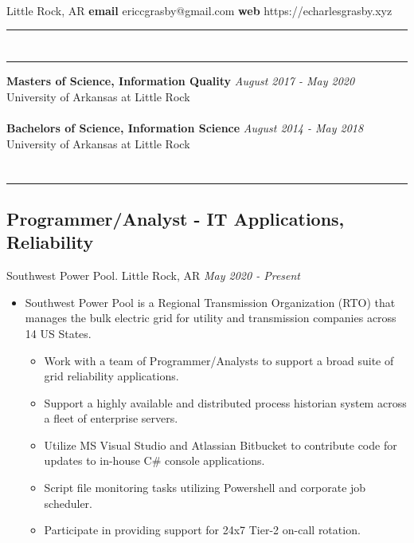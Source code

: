 \documentclass[11pt]{article}
\author{Eric Charles Grasby}
\newcommand{\ualr}{University of Arkansas at Little Rock}
\newcommand{\uppr}[3]{ \noindent\MakeUppercase{{\fontsize{#2}{#3} \selectfont {#1}}} }
\begin{document}
\begin{center}
\uppr{\textbf{Eric Charles Grasby}}{24}{28} \\
\vspace{20px}
Little Rock, AR \hfill \textbf{email} ericcgrasby@gmail.com \hfill \textbf{web} https://echarlesgrasby.xyz
\noindent \rule{1.0\textwidth}{0.4pt}
\end{center}

\section*{\uppr{Education}{14}{16}} \noindent \rule{1.0\textwidth}{0.4pt}
\textbf{Masters of Science, Information Quality} \hfill \textit{August 2017 - May 2020} \\
\ualr \\ \\
\textbf{Bachelors of Science, Information Science} \hfill \textit{August 2014 - May 2018} \\
\ualr

\section*{\uppr{Work Experience}{14}{16}} \noindent \rule{1.0\textwidth}{0.4pt}
\subsection*{Programmer/Analyst - IT Applications, Reliability}
Southwest Power Pool. Little Rock, AR \hfill \textit{May 2020 - Present} \\
\begin{itemize}
	\item Southwest Power Pool is a Regional Transmission Organization (RTO) that manages the bulk electric grid for utility and transmission companies across 14 US States.
 \begin{itemize}
  \item Work with a team of Programmer/Analysts to support a broad suite of grid reliability applications.
  \item Support a highly available and distributed process historian system across a fleet of enterprise servers.
  \item Utilize MS Visual Studio and Atlassian Bitbucket to contribute code for updates to in-house C\# console applications.
  \item Script file monitoring tasks utilizing Powershell and corporate job scheduler.
  \item Participate in providing support for 24x7 Tier-2 on-call rotation.
 \end{itemize}
\end{itemize}
\\
\end{document}
